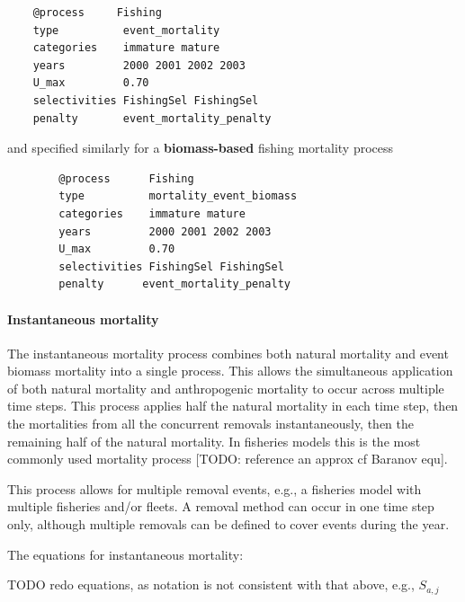 {\small{\begin{verbatim}
	@process     Fishing
	type          event_mortality
	categories    immature mature
	years         2000 2001 2002 2003
	U_max         0.70
	selectivities FishingSel FishingSel
	penalty       event_mortality_penalty
	\end{verbatim}}}

and specified similarly for a \textbf{biomass-based} fishing mortality process

{\small{\begin{verbatim}
		@process      Fishing
		type          mortality_event_biomass
		categories    immature mature
		years         2000 2001 2002 2003
		U_max         0.70
		selectivities FishingSel FishingSel
		penalty      event_mortality_penalty
		\end{verbatim}}}

\paragraph{Instantaneous mortality}\label{subsubsec:instantaneous-mortality}

The instantaneous mortality process combines both natural mortality and event biomass mortality into a single process. This allows the simultaneous application of both natural mortality and anthropogenic mortality to occur across multiple time steps. This process applies half the natural mortality in each time step, then the mortalities from all the concurrent removals instantaneously, then the remaining half of the natural mortality. In fisheries models this is the most commonly used mortality process [TODO: reference an approx cf Baranov equ].

This process allows for multiple removal events, e.g., a fisheries model with multiple fisheries and/or fleets. A removal method can occur in one time step only, although multiple removals can be defined to cover events during the year.

The equations for instantaneous mortality:

TODO redo equations, as notation is not consistent with that above, e.g., $S_{a,j}$

